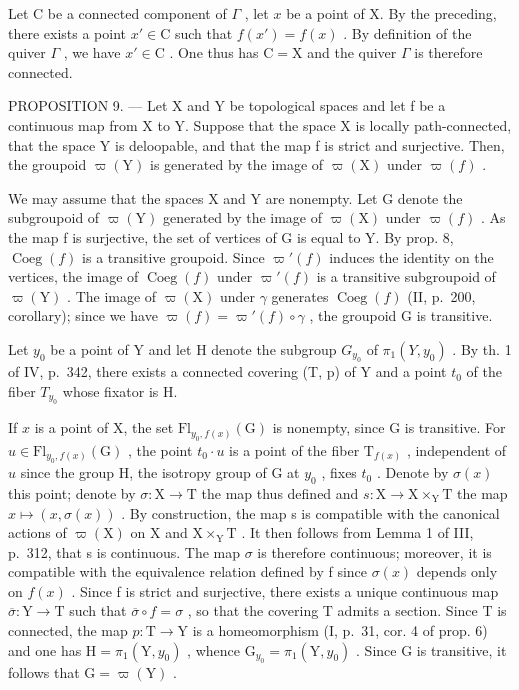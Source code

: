Let C be a connected component of \(\Gamma\) , let \(x\) be a point of X. By the preceding, there exists a point \(x' \in \mathrm{C}\) such that \(f(x') = f(x)\) . By definition of the quiver \(\Gamma\) , we have \(x' \in \mathrm{C}\) . One thus has \(\mathrm{C} = \mathrm{X}\) and the quiver \(\Gamma\) is therefore connected.

PROPOSITION 9. --- Let X and Y be topological spaces and let f be a continuous map from X to Y. Suppose that the space X is locally path-connected, that the space Y is deloopable, and that the map f is strict and surjective. Then, the groupoid \(\varpi(\mathrm{Y})\) is generated by the image of \(\varpi(\mathrm{X})\) under \(\varpi(f)\) .

We may assume that the spaces X and Y are nonempty. Let G denote the subgroupoid of \(\varpi(\mathrm{Y})\) generated by the image of \(\varpi(\mathrm{X})\) under \(\varpi(f)\) . As the map f is surjective, the set of vertices of G is equal to Y. By prop. 8, \(\operatorname{Coeg}(f)\) is a transitive groupoid. Since \(\varpi'(f)\) induces the identity on the vertices, the image of \(\operatorname{Coeg}(f)\) under \(\varpi'(f)\) is a transitive subgroupoid of \(\varpi(\mathrm{Y})\) . The image of \(\varpi(\mathrm{X})\) under \(\gamma\) generates \(\operatorname{Coeg}(f)\) (II, p.~200, corollary); since we have \(\varpi(f) = \varpi'(f) \circ \gamma\) , the groupoid G is transitive.

Let \(y_{0}\) be a point of Y and let H denote the subgroup \(G_{y_{0}}\) of \(\pi_{1}(Y, y_{0})\) . By th. 1 of IV, p.~342, there exists a connected covering (T, p) of Y and a point \(t_{0}\) of the fiber \(T_{y_{0}}\) whose fixator is H.

If \(x\) is a point of X, the set \(\mathrm{Fl}_{y_0,f(x)}(\mathrm{G})\) is nonempty, since G is transitive. For \(u\in \mathrm{Fl}_{y_0,f(x)}(\mathrm{G})\) , the point \(t_0\cdot u\) is a point of the fiber \(\mathrm{T}_{f(x)}\) , independent of \(u\) since the group H, the isotropy group of G at \(y_0\) , fixes \(t_0\) . Denote by \(\sigma (x)\) this point; denote by \(\sigma \colon \mathrm{X}\to \mathrm{T}\) the map thus defined and \(s\colon \mathrm{X}\to \mathrm{X}\times_{\mathrm{Y}}\mathrm{T}\) the map \(x\mapsto (x,\sigma (x))\) . By construction, the map s is compatible with the canonical actions of \(\varpi (\mathrm{X})\) on X and \(\mathrm{X}\times_{\mathrm{Y}}\mathrm{T}\) . It then follows from Lemma 1 of III, p.~312, that s is continuous. The map \(\sigma\) is therefore continuous; moreover, it is compatible with the equivalence relation defined by f since \(\sigma (x)\) depends only on \(f(x)\) . Since f is strict and surjective, there exists a unique continuous map \(\overline{\sigma}\colon \mathrm{Y}\to \mathrm{T}\) such that \(\overline{\sigma}\circ f = \sigma\) , so that the covering T admits a section. Since T is connected, the map \(p\colon \mathrm{T}\to \mathrm{Y}\) is a homeomorphism (I, p.~31, cor. 4 of prop. 6) and one has \(\mathrm{H} = \pi_1(\mathrm{Y},y_0)\) , whence \(\mathrm{G}_{y_0} = \pi_1(\mathrm{Y},y_0)\) . Since G is transitive, it follows that \(\mathrm{G} = \varpi (\mathrm{Y})\) .

